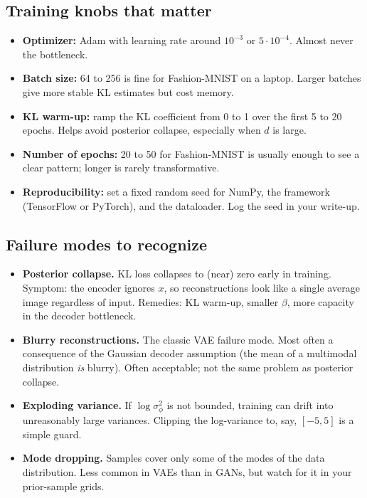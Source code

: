 \documentclass[11pt]{article}
\theoremstyle{remark}
\begin{document}
\subsection{Training knobs that matter}
\begin{itemize}[leftmargin=1.2em]
  \item \textbf{Optimizer:} Adam with learning rate around $10^{-3}$ or $5\cdot 10^{-4}$. Almost never the bottleneck.
  \item \textbf{Batch size:} 64 to 256 is fine for Fashion-MNIST on a laptop. Larger batches give more stable KL estimates but cost memory.
  \item \textbf{KL warm-up:} ramp the KL coefficient from 0 to 1 over the first 5 to 20 epochs. Helps avoid posterior collapse, especially when $d$ is large.
  \item \textbf{Number of epochs:} 20 to 50 for Fashion-MNIST is usually enough to see a clear pattern; longer is rarely transformative.
  \item \textbf{Reproducibility:} set a fixed random seed for NumPy, the framework (TensorFlow or PyTorch), and the dataloader. Log the seed in your write-up.
\end{itemize}

\subsection{Failure modes to recognize}
\begin{itemize}[leftmargin=1.2em]
  \item \textbf{Posterior collapse.} KL loss collapses to (near) zero early in training. Symptom: the encoder ignores $x$, so reconstructions look like a single average image regardless of input. Remedies: KL warm-up, smaller $\beta$, more capacity in the decoder bottleneck.
  \item \textbf{Blurry reconstructions.} The classic VAE failure mode. Most often a consequence of the Gaussian decoder assumption (the mean of a multimodal distribution \emph{is} blurry). Often acceptable; not the same problem as posterior collapse.
  \item \textbf{Exploding variance.} If $\log\sigma^2_\phi$ is not bounded, training can drift into unreasonably large variances. Clipping the log-variance to, say, $[-5,5]$ is a simple guard.
  \item \textbf{Mode dropping.} Samples cover only some of the modes of the data distribution. Less common in VAEs than in GANs, but watch for it in your prior-sample grids.
\end{itemize}
\end{document}
